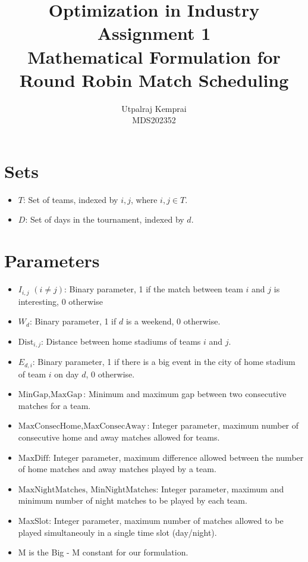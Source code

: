 \documentclass[a4paper, 12pt]{article}
\title{Optimization in Industry Assignment 1 \\ Mathematical Formulation for Round Robin Match Scheduling}
\author{Utpalraj Kemprai \\ MDS202352}
\date{}
\begin{document}
\maketitle

\section*{Sets}
\begin{itemize}
    \item $T$: Set of teams, indexed by $i, j$, where $i, j \in T$.
    \item $D$: Set of days in the tournament, indexed by $d$.
\end{itemize}

\section*{Parameters}
\begin{itemize}
    \item $I_{i,j}$ $(i \neq j)$: Binary parameter, 1 if the match between team $i$ and $j$ is interesting, 0 otherwise
    \item $W_{d}$: Binary parameter, 1 if $d$ is a weekend, 0 otherwise.
    \item $\text{Dist}_{i,j}$: Distance between home stadiums of teams $i$ and $j$.
    \item $E_{d,i}$: Binary parameter, 1 if there is a big event in the city of home stadium of team $i$ on day $d$, 0 otherwise.
    \item $\text{MinGap}, \text{MaxGap}$: Minimum and maximum gap between two consecutive matches for a team.
    \item $\text{MaxConsecHome},\text{MaxConsecAway}$: Integer parameter, maximum number of consecutive home and away matches allowed for teams.
    \item $\text{MaxDiff}$: Integer parameter, maximum difference allowed between the number of home matches and away matches played by a team.
    \item $\text{MaxNightMatches}$, $\text{MinNightMatches}$: Integer parameter, maximum and minimum number of night matches to be played by each team.
    \item MaxSlot: Integer parameter, maximum number of matches allowed to be played simultaneouly in a single time slot (day/night).
    \item M is the Big - M constant for our formulation.
\end{itemize}
\end{document}
